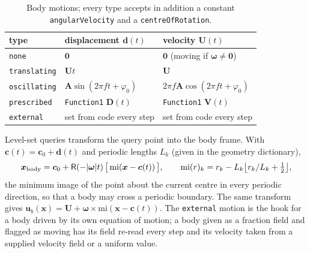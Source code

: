 \documentclass[11pt,a4paper]{article}
\theoremstyle{remark}
\newcommand{\uu}{\bm{u}}
\newcommand{\ub}{\uu_b}
\newcommand{\xx}{\bm{x}}
\newcommand{\code}[1]{\texttt{#1}}
\begin{document}
\begin{table}[htbp]\centering\small
\caption{Body motions; every type accepts in addition a constant \code{angularVelocity} and
a \code{centreOfRotation}.}
\label{tab:motions}
\begin{tabular}{@{}lll@{}}
\toprule
type & displacement $\bm d(t)$ & velocity $\bm U(t)$\\
\midrule
\code{none} & $\bm 0$ & $\bm 0$ (moving if $\bm\omega\neq\bm 0$)\\
\code{translating} & $\bm Ut$ & $\bm U$\\
\code{oscillating} & $\bm A\sin(2\pi ft+\varphi_0)$ & $2\pi f\bm A\cos(2\pi ft+\varphi_0)$\\
\code{prescribed} & \code{Function1} $\bm D(t)$ & \code{Function1} $\bm V(t)$\\
\code{external} & set from code every step & set from code every step\\
\bottomrule
\end{tabular}
\end{table}

Level-set queries transform the query point into the body frame. With $\bm c(t)=\bm c_0+\bm
d(t)$ and periodic lengths $L_k$ (given in the geometry dictionary),
\begin{equation}
\xx_{\rm body}=\bm c_0+\mathsf R(-|\bm\omega|t)\,\big[\,\mathrm{mi}(\xx-\bm c(t))\,\big],\qquad
\mathrm{mi}(r)_k=r_k-L_k\big\lfloor r_k/L_k+\tfrac12\big\rfloor ,
\end{equation}
the minimum image of the point about the current centre in every periodic direction, so that
a body may cross a periodic boundary. The same transform gives $\ub(\xx)=\bm U+\bm\omega\times
\mathrm{mi}(\xx-\bm c(t))$. The \code{external} motion is the hook for a body driven by its
own equation of motion; a body given as a fraction field and flagged as moving has its field
re-read every step and its velocity taken from a supplied velocity field or a uniform value.
\end{document}
